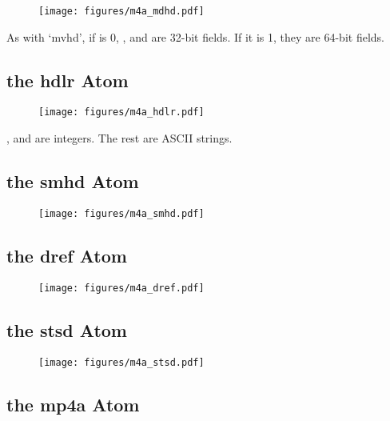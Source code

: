 \begin{figure}[h]
\texttt{[image: figures/m4a\_mdhd.pdf]}
\end{figure}
\par
\noindent
As with `mvhd', if  is 0, ,
 and  are 32-bit fields.
If it is 1, they are 64-bit fields.

\pagebreak

\subsection{the hdlr Atom}

\begin{figure}[h]
\texttt{[image: figures/m4a\_hdlr.pdf]}
\end{figure}
\par
\noindent
{},  and 
are integers.  The rest are ASCII strings.

\subsection{the smhd Atom}

\begin{figure}[h]
\texttt{[image: figures/m4a\_smhd.pdf]}
\end{figure}

\subsection{the dref Atom}

\begin{figure}[h]
\texttt{[image: figures/m4a\_dref.pdf]}
\end{figure}

\pagebreak

\subsection{the stsd Atom}

\begin{figure}[h]
\texttt{[image: figures/m4a\_stsd.pdf]}
\end{figure}

\subsection{the mp4a Atom}

